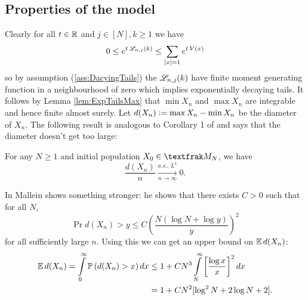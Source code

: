 \subsection{Properties of the model}
Clearly for all $t\in\mathbb{R}$ and $j \in [N], k \geq 1$ we have 
\begin{equation}\label{eqn:ExpTailsMaxIntegrable}
0 \leq e^{t\, \mathscr{L}_{n,j}(k)} \leq \sum_{|x|=1} e^{t\, V(x)}
\end{equation} so by assumption (\ref{ass:DacyingTails}) the $\mathscr{L}_{n,j}(k)$ have finite moment generating function in a neighbourhood of zero which implies exponentially decaying tails. It follows by Lemma \ref{lem:ExpTailsMax} that $\min X_n$ and $\max X_n$ are integrable and hence finite almost surely. Let $d(X_n) \vcentcolon= \max X_n - \min X_n$ be the diameter of $X_n$. The following result is analogous to Corollary 1 of \cite{exp_tails} and says that the diameter doesn't get too large:

\begin{proposition}\label{prop:diameter}
For any $N \geq 1$ and initial population $X_0 \in \frak{M}_N$, we have 
\begin{equation}\nonumber
\frac{d(X_n)}{n} \xrightarrow[n \to \infty]{a.s.,\, L^1} 0. 
\end{equation}
\end{proposition}

\begin{remark}
In \cite{mallein2018n} Mallein shows something stronger: he shows that there exists $C > 0$ such that for all $N$, 
\begin{equation}\nonumber
\Pr{d(X_n) > y} \leq C \left( \frac{N(\log N + \log y)}{y}\right)^2
\end{equation}
for all sufficiently large $n$. Using this we can get an upper bound on $\mathbb{E}\, d(X_n)$:
\begin{align*}
\mathbb{E}\, d(X_n) = \int\limits_0^\infty \mathbb{P} \left( d(X_n) > x \right) dx &\leq 1 + C N^3 \int\limits^\infty_N \left[\frac{\log x}{x}\right]^2 dx \\
													  &= 1 + C N^2[ \log^2 N + 2 \log N + 2]. 
\end{align*}
\end{remark}



